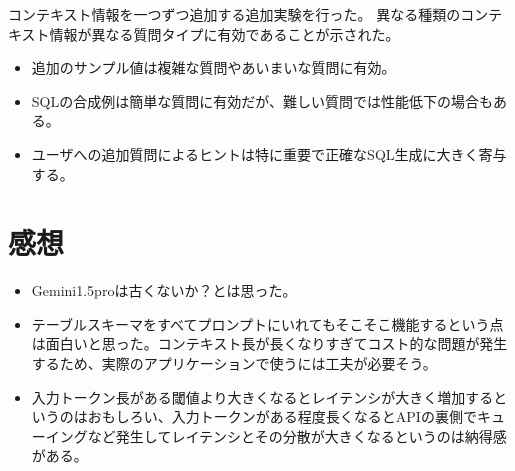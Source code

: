 \documentclass[dvipdfmx,uplatex]{jsarticle}
\theoremstyle{remark}
\newenvironment{experiment}[1]{
    \begin{tcolorbox}[
        colframe=violet,
        colback=violet!10!white,
        colbacktitle=violet!40!white,
        coltitle=black,
        fonttitle=\bfseries,
        title={#1}
    ]
}{
    \end{tcolorbox}
}
\newenvironment{kansou}{
    \begin{tcolorbox}[
        colframe=brown,
        colback=brown!10!white,
        colbacktitle=brown!40!white,
        coltitle=black,fonttitle=\bfseries
    ]
}{
    \end{tcolorbox}
}
\begin{document}
\begin{experiment}{Ablation Study}
コンテキスト情報を一つずつ追加する追加実験を行った。
異なる種類のコンテキスト情報が異なる質問タイプに有効であることが示された。
\begin{itemize}
    \item 追加のサンプル値は複雑な質問やあいまいな質問に有効。
    \item SQLの合成例は簡単な質問に有効だが、難しい質問では性能低下の場合もある。
    \item ユーザへの追加質問によるヒントは特に重要で正確なSQL生成に大きく寄与する。
\end{itemize}
\end{experiment}

\section{感想}
\begin{kansou}
\begin{itemize}
  \item Gemini1.5proは古くないか？とは思った。
  \item テーブルスキーマをすべてプロンプトにいれてもそこそこ機能するという点は面白いと思った。コンテキスト長が長くなりすぎてコスト的な問題が発生するため、実際のアプリケーションで使うには工夫が必要そう。
  \item 入力トークン長がある閾値より大きくなるとレイテンシが大きく増加するというのはおもしろい、入力トークンがある程度長くなるとAPIの裏側でキューイングなど発生してレイテンシとその分散が大きくなるというのは納得感がある。
\end{itemize}
\end{kansou}

\end{document}
